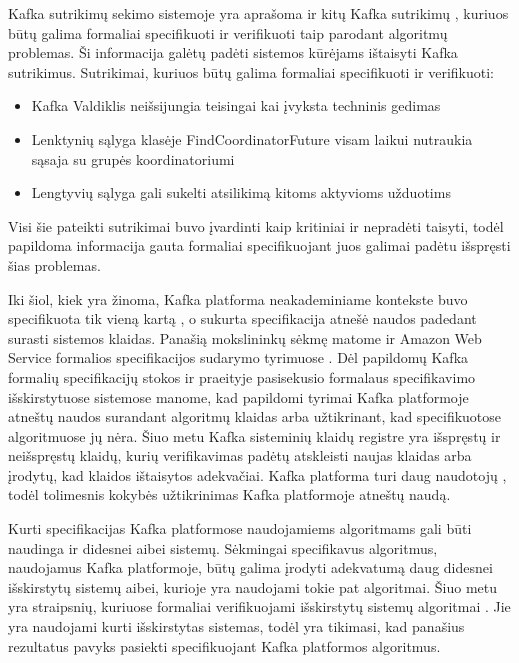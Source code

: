 \documentclass{VUMIFPSmagistrinis}
\begin{document}
		Kafka sutrikimų sekimo sistemoje yra aprašoma ir kitų Kafka sutrikimų \cite{kfkis} , kuriuos būtų galima formaliai specifikuoti ir verifikuoti taip parodant algoritmų problemas.
		Ši informacija galėtų padėti sistemos kūrėjams ištaisyti Kafka sutrikimus.
		Sutrikimai, kuriuos būtų galima formaliai specifikuoti ir verifikuoti:
		\begin{itemize}
			\item{Kafka Valdiklis neišsijungia teisingai kai įvyksta techninis gedimas \cite{kfkBug}}
			\item{Lenktynių sąlyga klasėje FindCoordinatorFuture visam laikui nutraukia sąsaja su grupės koordinatoriumi \cite{kfkistwo}}
			\item{Lengtyvių sąlyga gali sukelti atsilikimą kitoms aktyvioms užduotims \cite{kfkisthr}}
		\end{itemize}
		Visi šie pateikti sutrikimai buvo įvardinti kaip kritiniai ir nepradėti taisyti, todėl papildoma informacija gauta formaliai specifikuojant juos galimai padėtu išspręsti šias problemas.


		Iki šiol, kiek yra žinoma, Kafka platforma neakademiniame kontekste buvo specifikuota tik vieną kartą \cite{kfkTla}, o sukurta specifikacija atnešė naudos padedant surasti sistemos klaidas.
		Panašią mokslininkų sėkmę matome ir Amazon Web Service formalios specifikacijos sudarymo tyrimuose \cite{newcombe2014use}.
		Dėl papildomų Kafka formalių specifikacijų stokos ir praeityje pasisekusio formalaus specifikavimo išskirstytuose sistemose manome, kad papildomi tyrimai Kafka platformoje atneštų naudos surandant algoritmų klaidas arba užtikrinant, kad specifikuotose algoritmuose jų nėra.
		Šiuo metu Kafka sisteminių klaidų registre \cite{kfkissue} yra išspręstų ir neišspręstų  klaidų, kurių verifikavimas padėtų atskleisti naujas klaidas arba įrodytų, kad klaidos ištaisytos adekvačiai.
		Kafka platforma turi daug naudotojų \cite{kfk}, todėl tolimesnis kokybės užtikrinimas Kafka platformoje atneštų naudą.

		
		Kurti specifikacijas Kafka platformose naudojamiems algoritmams gali būti naudinga ir didesnei aibei sistemų. 
		Sėkmingai specifikavus algoritmus, naudojamus Kafka platformoje, būtų galima įrodyti adekvatumą daug didesnei išskirstytų sistemų aibei, kurioje yra naudojami tokie pat algoritmai. 
		Šiuo metu yra straipsnių, kuriuose formaliai verifikuojami išskirstytų sistemų algoritmai \cite{lamport2005generalized}. Jie yra naudojami kurti išskirstytas sistemas, todėl yra tikimasi, kad panašius rezultatus pavyks pasiekti specifikuojant Kafka platformos algoritmus.
	
\end{document}
